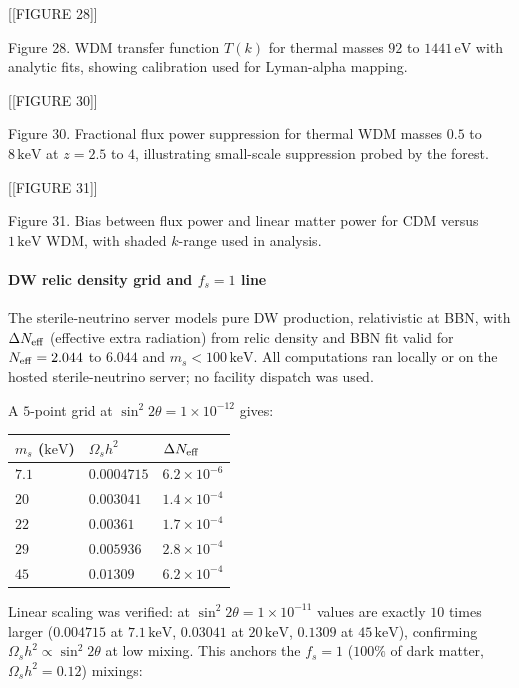 \documentclass[11pt,a4paper]{article}
\begin{document}
[[FIGURE 28]]

Figure 28. WDM transfer function $T(k)$ for thermal masses $92$ to $1441\,\mathrm{eV}$ with analytic fits, showing calibration used for Lyman-alpha mapping.


[[FIGURE 30]]

Figure 30. Fractional flux power suppression for thermal WDM masses $0.5$ to $8\,\mathrm{keV}$ at $z = 2.5$ to $4$, illustrating small-scale suppression probed by the forest.


[[FIGURE 31]]

Figure 31. Bias between flux power and linear matter power for CDM versus $1\,\mathrm{keV}$ WDM, with shaded $k$-range used in analysis.

\paragraph{DW relic density grid and $f_s=1$ line}
The sterile-neutrino server models pure DW production, relativistic at BBN, with $\Delta N_{\rm eff}$ (effective extra radiation) from relic density and BBN fit valid for $N_{\rm eff} = 2.044$ to $6.044$ and $m_s < 100\,\mathrm{keV}$. All computations ran locally or on the hosted sterile-neutrino server; no facility dispatch was used.

A $5$-point grid at $\sin^2 2\theta = 1\times10^{-12}$ gives:

\begin{longtable}{@{}p{}p{}p{}@{}}
\toprule
\textbf{$m_s$ ($\mathrm{keV}$)} & \textbf{$\Omega_s h^2$} & \textbf{$\Delta N_{\rm eff}$} \\ \midrule \endhead
$7.1$ & $0.0004715$ & $6.2\times10^{-6}$ \\
$20$ & $0.003041$ & $1.4\times10^{-4}$ \\
$22$ & $0.00361$ & $1.7\times10^{-4}$ \\
$29$ & $0.005936$ & $2.8\times10^{-4}$ \\
$45$ & $0.01309$ & $6.2\times10^{-4}$ \\
\bottomrule\end{longtable}
Linear scaling was verified: at $\sin^2 2\theta = 1\times10^{-11}$ values are exactly $10$ times larger ($0.004715$ at $7.1\,\mathrm{keV}$, $0.03041$ at $20\,\mathrm{keV}$, $0.1309$ at $45\,\mathrm{keV}$), confirming $\Omega_s h^2 \propto \sin^2 2\theta$ at low mixing. This anchors the $f_s = 1$ ($100\%$ of dark matter, $\Omega_s h^2 = 0.12$) mixings:
\end{document}
